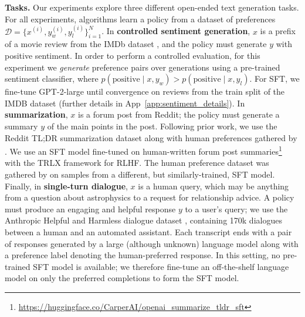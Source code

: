 \textbf{Tasks.} Our experiments explore three different open-ended text generation tasks. For all experiments, algorithms learn a policy from a dataset of preferences $\mathcal{D}=\bigl\{x^{(i)}, y_w^{(i)}, y_l^{(i)}\bigr\}_{i=1}^N$. In \textbf{controlled sentiment generation}, $x$ is a prefix of a movie review from the IMDb dataset \cite{maas-EtAl:2011:ACL-HLT2011}, and the policy must generate $y$ with positive sentiment. In order to perform a controlled evaluation, for this experiment we \textit{generate} preference pairs over generations using a pre-trained sentiment classifier, where $p(\text{positive}\mid x,y_w)>p(\text{positive}\mid x,y_l)$. For SFT, we fine-tune GPT-2-large until convergence on reviews from the train split of the IMDB dataset (further details in App~\ref{app:sentiment_details}). In \textbf{summarization}, $x$ is a forum post from Reddit; the policy must generate a summary $y$ of the main points in the post. Following prior work, we use the Reddit TL;DR summarization dataset \citep{volske-etal-2017-tl} along with human preferences gathered by \citeauthor{stiennon2022learning}. We use an SFT model fine-tuned on human-written forum post summaries\footnote{\url{https://huggingface.co/CarperAI/openai_summarize_tldr_sft}} with the TRLX \citep{leandro_von_werra_2023_7790115} framework for RLHF. The human preference dataset was gathered by \citeauthor{stiennon2022learning} on samples from a different, but similarly-trained, SFT model. Finally, in \textbf{single-turn dialogue}, $x$ is a human query, which may be anything from a question about astrophysics to a request for relationship advice. A policy must produce an engaging and helpful response $y$ to a user's query; we use the Anthropic Helpful and Harmless dialogue dataset \citep{bai2022training}, containing 170k dialogues between a human and an automated assistant. Each transcript ends with a pair of responses generated by a large (although unknown) language model along with a preference label denoting the human-preferred response. In this setting, no pre-trained SFT model is available; we therefore fine-tune an off-the-shelf language model on only the preferred completions to form the SFT model.

